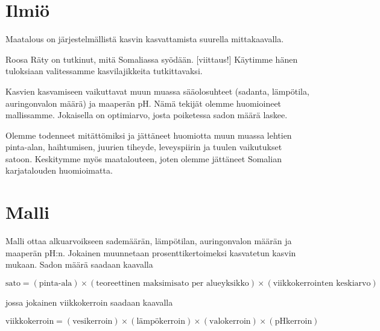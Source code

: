 \documentclass[12pt]{scrreprt}
\begin{document}
  \section{Ilmiö}

  Maatalous on järjestelmällistä kasvin kasvattamista suurella mittakaavalla.


  Roosa Räty on tutkinut, mitä Somaliassa syödään. [viittaus!] Käytimme hänen
  tuloksiaan valitessamme kasvilajikkeita tutkittavaksi.
  
  Kasvien kasvamiseen vaikuttavat muun muassa sääolosuhteet (sadanta, lämpötila,
  auringonvalon määrä) ja maaperän pH. Nämä tekijät olemme huomioineet
  mallissamme. Jokaisella on optimiarvo, josta poiketessa sadon määrä laskee.

  Olemme todenneet mitättömiksi ja jättäneet huomiotta muun muassa lehtien
  pinta-alan, haihtumisen, juurien tiheyde, leveyspiirin ja tuulen vaikutukset
  satoon. Keskitymme myös maatalouteen, joten olemme jättäneet Somalian
  karjatalouden huomioimatta.
  
  
  \section{Malli}

  Malli ottaa alkuarvoikseen sademäärän, lämpötilan, auringonvalon määrän ja
  maaperän pH:n. Jokainen muunnetaan prosenttikertoimeksi kasvatetun kasvin
  mukaan. Sadon määrä saadaan kaavalla

  \begin{em}
  $ \text{sato} = (\text{pinta-ala}) \times (\text{teoreettinen maksimisato per
  alueyksikko}) \times (\text{viikkokerrointen keskiarvo}) $\end{em}
  jossa jokainen viikkokerroin saadaan kaavalla

  \begin{em}
  $ \text{viikkokerroin} = (\text{vesikerroin}) \times (\text{lämpökerroin})
  \times (\text{valokerroin}) \times (\text{pHkerroin}) $\end{em}



\end{document}
